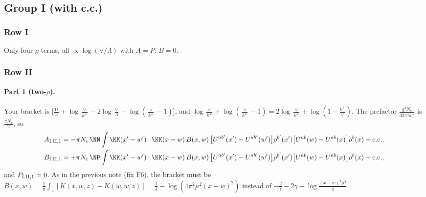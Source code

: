 \subsection{Group I (with c.c.)}
\subsubsection{Row I}
Only four-$\rho$ terms, all $\propto\log(\vee/\Lambda)$ with $A=P$: \textbf{$B=0$}.

\subsubsection{Row II}\label{sec:I.II}
\paragraph{Part 1 (two-$\rho$).} Your bracket is $\big[\frac{11}{3}+\log\frac{\vee}{k^+}-2\log\frac{\vee}{\Lambda}+\log(\frac{\vee}{k^+}-1)\big]$, and $\log\frac{\vee}{k^+}+\log(\frac{\vee}{k^+}-1)=2\log\frac{\vee}{k^+}+\log(1-\frac{k^+}{\vee})$. The prefactor $\frac{g^4N_c}{32\pi^4k^+}$ is $\frac{\pi N_c}{2}$, so
\begin{align}
A_{\rm I.II,1}&=-\pi N_c\,\NN\int\KK(x'-w')\cdot\KK(x-w)\,B(x,w)\,\big[U^{ab'}(x')-U^{ab'}(w')\big]\rho^{b'}(x')\big[U^{ab}(w)-U^{ab}(x)\big]\rho^b(x)+{\rm c.c.},\notag\\
B_{\rm I.II,1}&=+\pi N_c\,\NP\int\KK(x'-w')\cdot\KK(x-w)\,B(x,w)\,\big[U^{ab'}(x')-U^{ab'}(w')\big]\rho^{b'}(x')\big[U^{ab}(w)-U^{ab}(x)\big]\rho^b(x)+{\rm c.c.},
\end{align}
and $P_{\rm I.II,1}=0$. As in the previous note (fix F6), the bracket must be $B(x,w)=\frac1\pi\int_z[K(x,w,z)-K(w,w,z)]=\frac1{\bar\epsilon}-\log(4\pi^2\mu^2(x-w)^2)$ instead of $-\frac2\epsilon-2\gamma-\log\frac{(x-w)^2\mu^2}{4}$.

